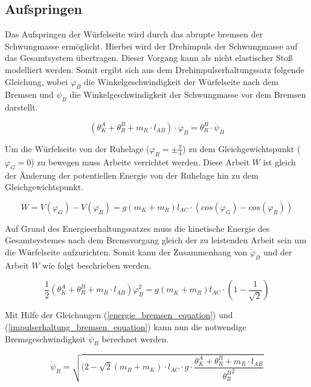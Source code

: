\subsection{Aufspringen}
Das Aufspringen der Würfelseite wird durch das abrupte bremsen der Schwungmasse ermöglicht. Hierbei wird der Drehimpuls der Schwungmasse auf das Gesamtsystem übertragen. Dieser Vorgang kann als nicht elastischer Stoß modelliert werden. Somit ergibt sich aus dem Drehimpulserhaltungssatz folgende Gleichung, wobei $\dot{\varphi}_B$ die Winkelgeschwindigkeit der Würfelseite nach dem Bremsen und $\dot{\psi}_B$ die Winkelgeschwindigkeit der Schwungmasse vor dem Bremsen darstellt.

\begin{equation}
\label{impulserhaltung_bremsen_equation}
(\theta^A_K + \theta^B_R + m_R \cdot l_{AB}) \cdot \dot{\varphi}_B = \theta^B_R \cdot \dot{\psi}_B
\end{equation} 

Um die Würfelseite von der Ruhelage ($\varphi_R = \pm \frac{\pi}{4}$) zu dem Gleichgewichtspunkt ($\varphi_G = 0$) zu bewegen muss Arbeite verrichtet werden. Diese Arbeit $W$ ist gleich der Änderung der potentiellen Energie von der Ruhelage hin zu dem Gleichgewichtspunkt.

\begin{equation}
\label{arbeit_bremsen_equation}
W = V(\varphi_G) - V(\varphi_R) = g(m_K + m_R) l_{AC} \cdot (cos(\varphi_G) - cos(\varphi_R))
\end{equation}

Auf Grund des Energieerhaltungssatzes muss die kinetische Energie des Gesamtsystemes nach dem Bremsvorgang gleich der zu leistenden Arbeit sein um die Würfelseite aufzurichten. Somit kann der Zusammenhang von $\dot{\varphi}_B$ und der Arbeit $W$ wie folgt beschrieben werden.

\begin{equation}
\label{energie_bremsen_equation}
\frac{1}{2}(\theta^A_K + \theta^B_R + m_R \cdot l_{AB}) \dot{\varphi}_B^2 = g(m_K + m_R) l_{AC} \cdot (1 - \frac{1}{\sqrt{2}})
\end{equation}

Mit Hilfe der Gleichungen (\ref{energie_bremsen_equation}) und (\ref{impulserhaltung_bremsen_equation}) kann nun die notwendige Bremsgeschwindigkeit $\dot{\psi}_B$ berechnet werden.

\begin{equation}
\label{psi_bremsen_equation}
\dot{\psi}_B = \sqrt{(2-\sqrt{2}(m_R + m_K) \cdot l_{AC} \cdot g \cdot \frac{\theta^A_K + \theta^B_R + m_R \cdot l_{AB}}{{\theta^B_R}^2}}
\end{equation}

